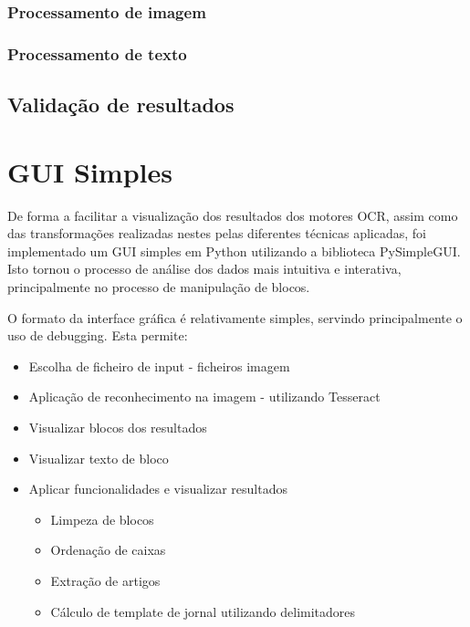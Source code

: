 

\subsubsection{Processamento de imagem}
\label{contribution_image_processing}

\subsubsection{Processamento de texto}
\label{contribution_text_processing}


\subsection{Validação de resultados}
\label{contribution_results_validation}







\section{GUI Simples}
\label{gui_simples}

De forma a facilitar a visualização dos resultados dos motores OCR, assim como das transformações realizadas nestes pelas diferentes técnicas aplicadas, foi implementado um GUI simples em Python utilizando a biblioteca PySimpleGUI. Isto tornou o processo de análise dos dados mais intuitiva e interativa, principalmente no processo de manipulação de blocos.

O formato da interface gráfica é relativamente simples, servindo principalmente o uso de debugging. Esta permite:

\begin{itemize}\setlength\itemsep{0.05cm}
    \item Escolha de ficheiro de input - ficheiros imagem
    \item Aplicação de reconhecimento na imagem - utilizando Tesseract
    \item Visualizar blocos dos resultados
    \item Visualizar texto de bloco
    \item Aplicar funcionalidades e visualizar resultados
    \begin{itemize}
        \item Limpeza de blocos
        \item Ordenação de caixas
        \item Extração de artigos
        \item Cálculo de template de jornal utilizando delimitadores
    \end{itemize}
\end{itemize}

